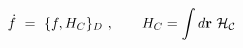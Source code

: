 \begin{equation}
\dot{f}\ =\ \{f,H_{C}\}_{D}\ ,\qquad H_{C}=\int d{\bf r}\ {\cal H_{C}}
\label{timevolD}
\end{equation}%
